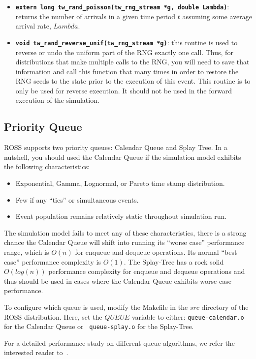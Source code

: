 \documentclass[12pt]{article}
\begin{document}
\begin{itemize}
\item {\tt\bf extern long tw\_rand\_poisson(tw\_rng\_stream *g, double
  Lambda)}: returns the number of arrivals in a given time period $t$ assuming
  some average arrival rate, $Lambda$.

\item {\tt\bf void tw\_rand\_reverse\_unif(tw\_rng\_stream *g)}: this routine
  is used to reverse or undo the uniform part of the RNG exactly one
  call. Thus, for distributions that make multiple calls to the RNG, you will
  need to save that information and call this function that many times in
  order to restore the RNG seeds to the state prior to the execution of this
  event. This routine is to only be used for reverse execution. It should not
  be used in the forward execution of the simulation.
\end{itemize}

\subsection{Priority Queue}
ROSS supports two priority queues: Calendar Queue and Splay Tree.
In a nutshell, you should used the Calendar Queue if the simulation
model exhibits the following characteristics:

\begin{itemize}
\item Exponential, Gamma, Lognormal, or Pareto time stamp distribution.
\item Few if any ``ties'' or simultaneous events.
\item Event population remains relatively static throughout
simulation run.
\end{itemize}

The simulation model fails to meet any of these characteristics, there
is a strong chance the Calendar Queue will shift into running its
``worse case'' performance range, which is $O(n)$ for enqueue and
dequeue operations. Its normal ``best case'' performance complexity
is $O(1)$. The Splay-Tree has a rock solid $O(log(n))$ performance
complexity for enqueue and dequeue operations and thus should be used
in cases where the Calendar Queue exhibits worse-case performance.

To configure which queue is used, modify the Makefile in the $src$
directory of the ROSS distribution. Here, set the $QUEUE$ variable to
either: {\tt queue-calendar.o} for the Calendar Queue or {\tt
queue-splay.o} for the Splay-Tree.

For a detailed performance study on different queue algorithms,
we refer the interested reader to~\cite{ronngren-tomacs-1997}.
\end{document}
